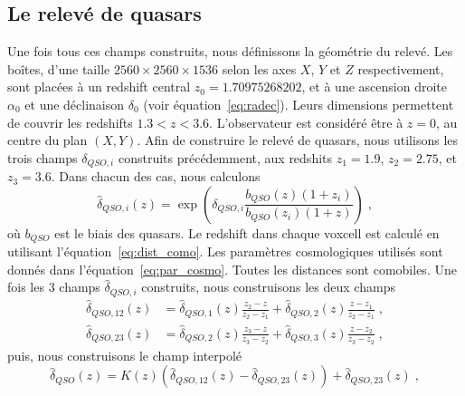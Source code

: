 \documentclass[11pt, twoside, a4paper, openright]{report}
\begin{document}
\subsection{Le relevé de quasars}
Une fois tous ces champs construits, nous définissons la géométrie du relevé. Les boîtes, d'une taille $\num{2560}\times\num{2560}\times\num{1536}$ selon les axes $X$, $Y$ et $Z$ respectivement, sont placées à un redshift central $z_0 = 1.70975268202$, et à une ascension droite $\alpha_0$ et une déclinaison $\delta_0$ (voir équation~\ref{eq:radec}). Leurs dimensions permettent de couvrir les redshifts $1.3 < z < 3.6$. L'observateur est considéré être à $z=0$, au centre du plan $(X,Y)$.
Afin de construire le relevé de quasars, nous utilisons les trois champs $\delta_{QSO, i}$ construits précédemment, aux redshits $z_1 = \num{1.9}$, $z_2 = \num{2.75}$, et $z_3 = \num{3.6}$. Dans chacun des cas, nous calculons
\begin{equation}
  \hat \delta_{QSO, i}(z) = \exp(\delta_{QSO,i} \frac{b_{QSO}(z) (1+z_i)}{b_{QSO}(z_i)(1+z)}) \; ,
\end{equation}
où $b_{QSO}$ est le biais des quasars. Le redshift dans chaque voxcell est calculé en utilisant l'équation~\ref{eq:dist_como}. Les paramètres cosmologiques utilisés sont donnés dans l'équation~\ref{eq:par_cosmo}. Toutes les distances sont comobiles.
Une fois les 3 champs $\hat \delta_{QSO, i}$ construits, nous construisons les deux champs
\begin{align}
  \hat \delta_{QSO, 12}(z) &= \hat \delta_{QSO, 1}(z) \frac{z_2 - z}{z_2 - z_1} + \hat \delta_{QSO, 2}(z) \frac{z - z_1}{z_2 - z_1} \; ,\\
  \hat \delta_{QSO, 23}(z) &= \hat \delta_{QSO, 2}(z) \frac{z_3 - z}{z_3 - z_2} + \hat \delta_{QSO, 3}(z) \frac{z - z_2}{z_3 - z_2} \; ,
\end{align}
puis, nous construisons le champ interpolé
\begin{equation}
  \label{eq:lognormal_interp}
 \hat \delta_{QSO}(z) = K(z) \left(\hat \delta_{QSO, 12}(z) - \hat \delta_{QSO, 23}(z)\right) + \hat \delta_{QSO, 23}(z) \; ,
\end{equation}
\end{document}
